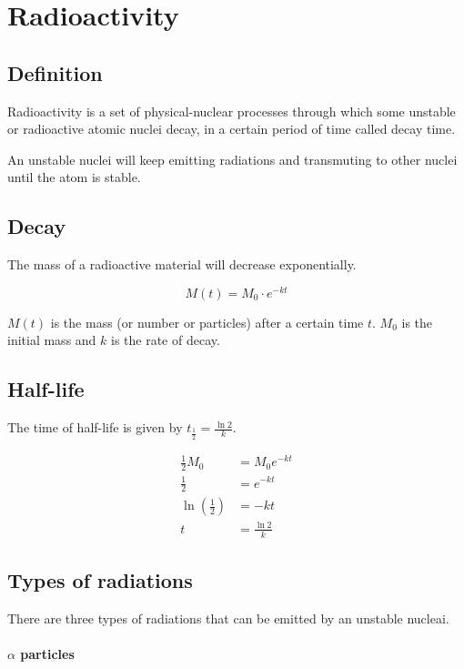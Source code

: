 \documentclass[a4paper]{article}
\begin{document}


\section{Radioactivity}

\subsection{Definition}

Radioactivity is a set of physical-nuclear processes
through which some unstable or radioactive atomic nuclei decay,
in a certain period of time called decay time.

An unstable nuclei will keep emitting radiations
and transmuting to other nuclei until the atom is stable.

\subsection{Decay}

The mass of a radioactive material will decrease exponentially.

\[
    M(t) = M_0 \cdot e^{-kt}
\]

\(M(t)\) is the mass (or number or particles)
after a certain time \(t\). \(M_0\) is the initial mass
and \(k\) is the rate of decay.

\subsection{Half-life}

The time of half-life is given by \(t_\frac{1}{2} = \frac{\ln 2}{k}\).

\begin{align*}
    \frac{1}{2}M_0 &= M_0 e^{-kt} \\
    \frac{1}{2} &= e^{-kt} \\
    \ln\left(\frac{1}{2}\right) &= -kt \\
    t &= \frac{\ln 2}{k}
\end{align*}

\subsection{Types of radiations}

There are three types of radiations that can be emitted by an unstable nucleai.

\paragraph{\(\alpha\) particles}
\end{document}
